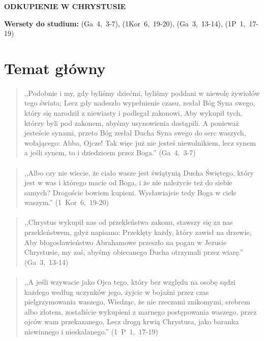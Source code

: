 \documentclass[10pt,a4paper,oneside]{article}
\begin{document}
\centerline{\textbf{\MakeUppercase{Odkupienie w Chrystusie}}}
\begin{center}
\textbf{Wersety do studium:} 
\mbox{(Ga 4, 3-7)}, \mbox{(1Kor 6, 19-20)}, \mbox{(Ga 3, 13-14)}, \mbox{(1P 1, 17-19)}
\end{center}
\section{Temat główny}
\paragraph{}
\begin{quote}
,,Podobnie i my, gdy byliśmy dziećmi, byliśmy poddani w niewolę żywiołów tego świata; Lecz gdy nadeszło wypełnienie czasu, zesłał Bóg Syna swego, który się narodził z niewiasty i podlegał zakonowi, Aby wykupił tych, którzy byli pod zakonem, abyśmy usynowienia dostąpili. A ponieważ jesteście synami, przeto Bóg zesłał Ducha Syna swego do serc waszych, wołającego: Abba, Ojcze! Tak więc już nie jesteś niewolnikiem, lecz synem a jeśli synem, to i dziedzicem przez Boga.'' \mbox{(Ga 4, 3-7)}
\end{quote}
\paragraph{}
\begin{quote}
,,Albo czy nie wiecie, że ciało wasze jest świątynią Ducha Świętego, który jest w was i którego macie od Boga, i że nie należycie też do siebie samych? Drogoście bowiem kupieni. Wysławiajcie tedy Boga w ciele waszym.'' \mbox{(1 Kor 6, 19-20)}
\end{quote}
\paragraph{}
\begin{quote}
,,Chrystus wykupił nas od przekleństwa zakonu, stawszy się za nas przekleństwem, gdyż napisano: Przeklęty każdy, który zawisł na drzewie, Aby błogosławieństwo Abrahamowe przeszło na pogan w Jezusie Chrystusie, my zaś, abyśmy obiecanego Ducha otrzymali przez wiarę.'' \mbox{(Ga 3, 13-14)}
\end{quote}
\paragraph{}
\begin{quote}
,,A jeśli wzywacie jako Ojca tego, który bez względu na osobę sądzi każdego według uczynków jego, żyjcie w bojaźni przez czas pielgrzymowania waszego, Wiedząc, że nie rzeczami znikomymi, srebrem albo złotem, zostaliście wykupieni z marnego postępowania waszego, przez ojców wam przekazanego, Lecz drogą krwią Chrystusa, jako baranka niewinnego i nieskalanego.'' \mbox{(1 P 1, 17-19)}
\end{quote}
\end{document}
